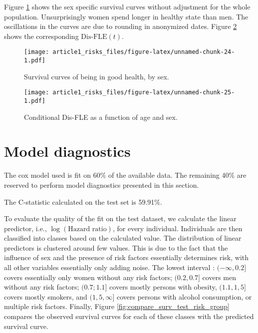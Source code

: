 \documentclass[risks,article,submit,moreauthors,pdftex]{Definitions/mdpi}
\begin{document}
Figure \ref{fig:health-surv-curve-nocov} shows the sex specific survival
curves without adjustment for the whole population. Unsurprisingly women
spend longer in healthy state than men. The oscillations in the curves
are due to rounding in anonymized dates. Figure
\ref{fig:health-expect-curve-nocov} shows the corresponding
\(\text{Dis-FLE}(t)\).

\begin{figure}
\centering
\texttt{[image: article1\_risks\_files/figure-latex/unnamed-chunk-24-1.pdf]}
\caption{\label{fig:health-surv-curve-nocov}Survival curves of being in
good health, by sex.}
\end{figure}

\begin{figure}
\centering
\texttt{[image: article1\_risks\_files/figure-latex/unnamed-chunk-25-1.pdf]}
\caption{\label{fig:health-expect-curve-nocov}Conditional Dis-FLE as a
function of age and sex.}
\end{figure}

\newpage

\hypertarget{model-diagnostics}{%
\section{Model diagnostics}\label{model-diagnostics}}

The cox model used is fit on 60\% of the available data. The remaining
40\% are reserved to perform model diagnostics presented in this
section.

The C-statistic calculated on the test set is 59.91\%.

To evaluate the quality of the fit on the test dataset, we calculate the
linear predictor, i.e., \(\log(\text{Hazard ratio})\), for every
individual. Individuals are then classified into classes based on the
calculated value. The distribution of linear predictors is clustered
around few values. This is due to the fact that the influence of sex and
the presence of risk factors essentially determines risk, with all other
variables essentially only adding noise. The lowest interval :
\((-\infty, 0.2]\) covers essentially only women without any risk
factors; \((0.2, 0.7]\) covers men without any risk factors;
\((0.7; 1.1]\) covers mostly persons with obesity, \((1.1, 1,5]\) covers
mostly smokers, and \((1,5, \infty]\) covers persons with alcohol
consumption, or multiple risk factors. Finally, Figure
\ref{fig:compare_surv_test_risk_group} compares the observed survival
curves for each of these classes with the predicted survival curve.
\end{document}
